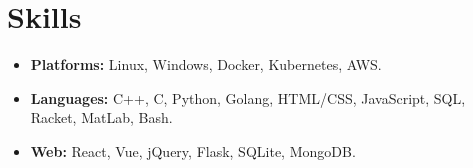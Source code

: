 \section*{Skills}
\begin{itemize}
    \item 
    \textbf{Platforms:} Linux, Windows, Docker, Kubernetes, AWS.
    \item 
    \textbf{Languages:} C++, C, Python, Golang, HTML/CSS, JavaScript, SQL, Racket, MatLab, Bash.
    \item 
    \textbf{Web:} React, Vue, jQuery, Flask, SQLite, MongoDB.
\end{itemize}
